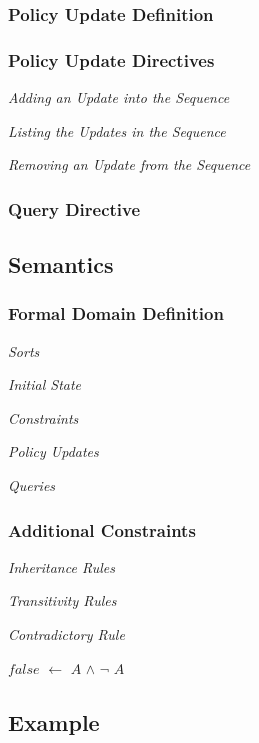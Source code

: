 \documentclass[10pt, twocolumn]{article}
\begin{document}
      \subsubsection{Policy Update Definition}

      \subsubsection{Policy Update Directives}

        \noindent \emph{Adding an Update into the Sequence}

        \noindent \emph{Listing the Updates in the Sequence}

        \noindent \emph{Removing an Update from the Sequence}

      \subsubsection{Query Directive}

    \subsection{Semantics}

      \subsubsection{Formal Domain Definition}

        \noindent \emph{Sorts}

        \noindent \emph{Initial State}

        \noindent \emph{Constraints}

        \noindent \emph{Policy Updates}

        \noindent \emph{Queries}

      \subsubsection{Additional Constraints}

        \noindent \emph{Inheritance Rules}

        \noindent \emph{Transitivity Rules}

        \noindent \emph{Contradictory Rule}

          $false$ $\leftarrow$ $A$ $\land$ $\lnot$ $A$

    \subsection{Example}
\end{document}
